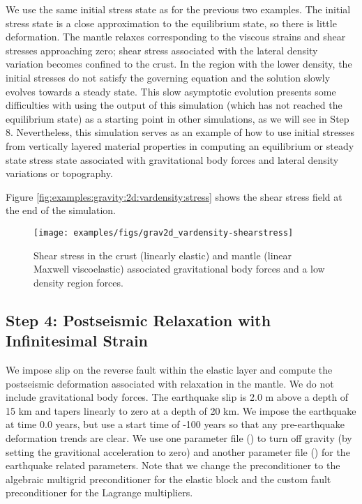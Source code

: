 We use the same initial stress state as for the previous two examples.
The initial stress state is a close approximation to the equilibrium
state, so there is little deformation. The mantle relaxes
corresponding to the viscous strains and shear stresses approaching
zero; shear stress associated with the lateral density variation
becomes confined to the crust. In the region with the lower density,
the initial stresses do not satisfy the governing equation and the
solution slowly evolves towards a steady state. This slow asymptotic
evolution presents some difficulties with using the output of this
simulation (which has not reached the equilibrium state) as a starting
point in other simulations, as we will see in Step 8. Nevertheless,
this simulation serves as an example of how to use initial stresses
from vertically layered material properties in computing an
equilibrium or steady state stress state associated with gravitational
body forces and lateral density variations or topography.

Figure \vref{fig:examples:gravity:2d:vardensity:stress} shows the
shear stress field at the end of the simulation.

\begin{figure}
  \texttt{[image: examples/figs/grav2d\_vardensity-shearstress]}
  \caption{Shear stress in the crust (linearly elastic) and mantle
    (linear Maxwell viscoelastic) associated gravitational body forces
    and a low density region forces.}
  \label{fig:examples:gravity:2d:vardensity:stress}
\end{figure}


\subsection{Step 4: Postseismic Relaxation with Infinitesimal Strain}

We impose slip on the reverse fault within the elastic layer and
compute the postseismic deformation associated with relaxation in the
mantle.  We do not include gravitational body forces. The earthquake
slip is 2.0 m above a depth of 15 km and tapers linearly to zero at a
depth of 20 km. We impose the earthquake at time 0.0 years, but use a
start time of -100 years so that any pre-earthquake deformation trends
are clear. We use one parameter file () to
turn off gravity (by setting the gravitional acceleration to zero) and
another parameter file () for the earthquake
related parameters. Note that we change the preconditioner to the
algebraic multigrid preconditioner for the elastic block and the
custom fault preconditioner for the Lagrange multipliers.

